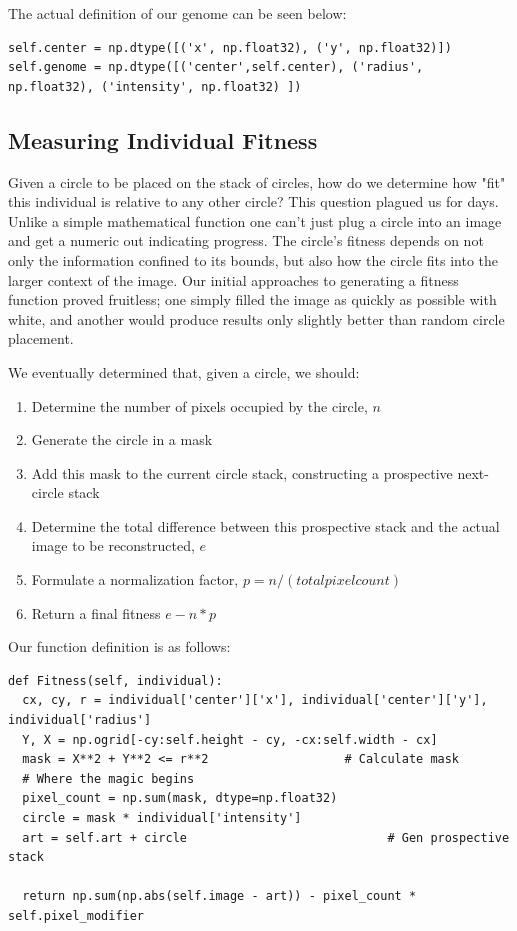 \documentclass[12pt]{article}
\begin{document}
The actual definition of our genome can be seen below:
\begin{lstlisting}
self.center = np.dtype([('x', np.float32), ('y', np.float32)])
self.genome = np.dtype([('center',self.center), ('radius', np.float32), ('intensity', np.float32) ])
\end{lstlisting}


\subsection{Measuring Individual Fitness}
Given a circle to be placed on the stack of circles, how do we determine how "fit" this individual is relative to any other circle? This question plagued us for days. Unlike a simple mathematical function one can't just plug a circle into an image and get a numeric out indicating progress. The circle's fitness depends on not only the information confined to its bounds, but also how the circle fits into the larger context of the image. Our initial approaches to generating a fitness function proved fruitless; one simply filled the image as quickly as possible with white, and another would produce results only slightly better than random circle placement. 

We eventually determined that, given a circle, we should:
\begin{enumerate}
\item Determine the number of pixels occupied by the circle, $n$
\item Generate the circle in a mask
\item Add this mask to the current circle stack, constructing  a prospective next-circle stack
\item Determine the total difference between this prospective stack and the actual image to be reconstructed, $e$
\item Formulate a normalization factor, $p = n/(total pixel count)$
\item Return a final fitness $e - n*p$
\end{enumerate}

Our function definition is as follows:
\begin{lstlisting}
def Fitness(self, individual):
  cx, cy, r = individual['center']['x'], individual['center']['y'], individual['radius']
  Y, X = np.ogrid[-cy:self.height - cy, -cx:self.width - cx]
  mask = X**2 + Y**2 <= r**2                   # Calculate mask
  # Where the magic begins
  pixel_count = np.sum(mask, dtype=np.float32)
  circle = mask * individual['intensity']
  art = self.art + circle 						     # Gen prospective stack

  return np.sum(np.abs(self.image - art)) - pixel_count * self.pixel_modifier
\end{lstlisting}
\end{document}
